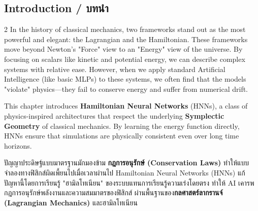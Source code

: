 \subsection{Introduction \quad / \quad \textthai{บทนำ}}
\begin{paracol}{2}
In the history of classical mechanics, two frameworks stand out as the most powerful and elegant: the Lagrangian and the Hamiltonian. These frameworks move beyond Newton's "Force" view to an "Energy" view of the universe. By focusing on scalars like kinetic and potential energy, we can describe complex systems with relative ease. However, when we apply standard Artificial Intelligence (like basic MLPs) to these systems, we often find that the models "violate" physics—they fail to conserve energy and suffer from numerical drift.

This chapter introduces \textbf{Hamiltonian Neural Networks} (HNNs), a class of physics-inspired architectures that respect the underlying \textbf{Symplectic Geometry} of classical mechanics. By learning the energy function directly, HNNs ensure that simulations are physically consistent even over long time horizons.

\switchcolumn

\begin{thai}
ปัญญาประดิษฐ์แบบมาตรฐานมักมองข้าม \textbf{กฎการอนุรักษ์ (Conservation Laws)} ทำให้แบบจำลองทางฟิสิกส์ผิดเพี้ยนไปเมื่อเวลาผ่านไป Hamiltonian Neural Networks (HNNs) แก้ปัญหานี้โดยการเรียนรู้ "ฮามิลโทเนียน" ของระบบแทนการเรียนรู้ความเร่งโดยตรง ทำให้ AI เคารพกฎการอนุรักษ์พลังงานและความสมมาตรของฟิสิกส์ ผ่านพื้นฐานของ\textbf{กลศาสตร์ลากรานจ์ (Lagrangian Mechanics)} และฮามิลโทเนียน
\end{thai}
\end{paracol}
